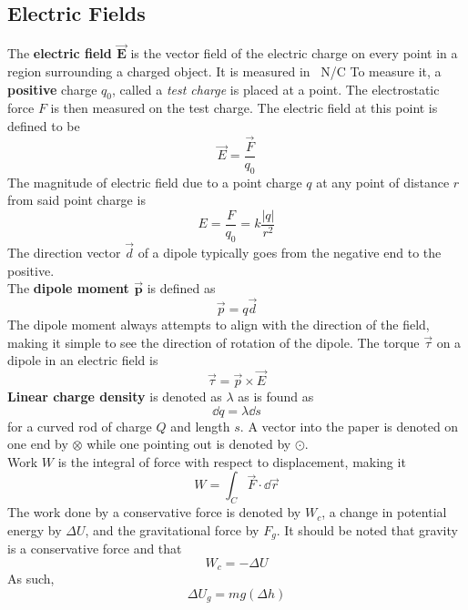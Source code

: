 \documentclass[./Electricity and Magnetism.tex]{subfiles}
\begin{document}
		\subsection{Electric Fields}
			The \textbf{electric field \(\bm{\vec{E}}\)} is the vector field of the electric charge on every point in a region surrounding a charged object. It is measured in \SI{}{N/C} To measure it, a \textbf{positive} charge \(q_0\), called a \textit{test charge} is placed at a point. The electrostatic force \(F\) is then measured on the test charge. The electric field at this point is defined to be
				\[\vec{E} = \frac{\vec{F}}{q_0}\]
				The magnitude of electric field due to a point charge \(q\) at any point of distance \(r\) from said point charge is
				\[E = \frac{F}{q_0} = k\frac{|q|}{r^2}\]
			The direction vector \(\vec{d}\) of a dipole typically goes from the negative end to the positive. \\
			The \textbf{dipole moment \(\bm{\vec{p}}\)} is defined as
				\[\vec{p} = q\vec{d}\]
				The dipole moment always attempts to align with the direction of the field, making it simple to see the direction of rotation of the dipole.
			The torque \(\vec{\tau}\) on a dipole in an electric field is
				\[\vec{\tau} = \vec{p} \times \vec{E}\]
			\textbf{Linear charge density} is denoted as \(\lambda\) as is found as
				\[\dd{q} = \lambda \dd{s}\]
				for a curved rod of charge \(Q\) and length \(s\).
			A vector into the paper is denoted on one end by \(\otimes\) while one pointing out is denoted by \(\odot\). \\
			Work \(W\) is the integral of force with respect to displacement, making it
				\[W = \int_C \vec{F} \cdot \dd{\vec{r}}\]
				The work done by a conservative force is denoted by \(W_c\), a change in potential energy by \(\Delta U\), and the gravitational force by \(F_g\). It should be noted that gravity is a conservative force and that
				\[W_c = -\Delta U\]
				As such,
				\[\Delta U_g = mg(\Delta h)\]
\end{document}
